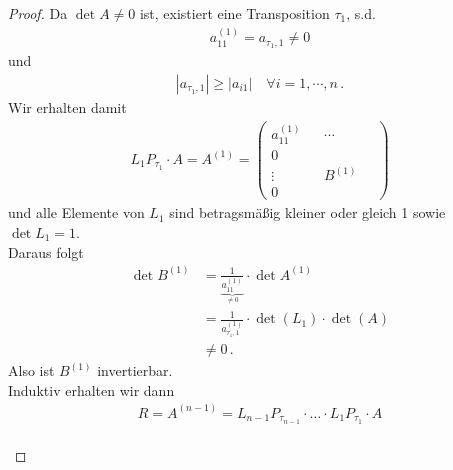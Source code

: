 \begin{proof}
  Da $\det A \neq 0$ ist, existiert eine Transposition $\tau_1$, s.d. 
  \begin{gather*}a_{11}^{(1)}= a_{\tau_1, 1} \neq 0 \end{gather*}
  und
  \begin{gather*}
    | a_{\tau_1, 1} | \geq |a_{i1}| 
    \quad \forall i=1, \cdots, n \, . 
  \end{gather*}
  Wir erhalten damit
  \begin{gather*}
    L_1P_{\tau_1} \cdot A = A^{(1)} = \begin{pmatrix}
      a_{11}^{(1)} && \cdots ~&  ~\\
      0 \\
      \vdots && B^{(1)} \\
      0
    \end{pmatrix}
  \end{gather*}
  und alle Elemente von $L_1 $ sind betragsmäßig kleiner oder gleich 1 sowie
  $\det L_1 = 1 $. \\
  Daraus folgt
  \begin{align*}
    \det B^{(1)} & = \frac{1}{\underbrace{a_{11}^{(1)}}_{\neq 0}} \cdot \det A^{(1)} \\
                 & = \frac{1}{a_{\tau_1, 1}^{(1)}}\cdot \det (L_1) \cdot \det (A) \\
                 & \neq 0 \, .
  \end{align*}
  Also ist $B^{(1)}$ invertierbar. \\
  
  Induktiv erhalten wir dann
  \begin{gather*}
    R = A^{(n-1)} = L_{n-1}P_{\tau_{n-1}} \cdot \dotsc \cdot L_1 P_{\tau_1} \cdot A
  \end{gather*}\\
  


\end{proof}
